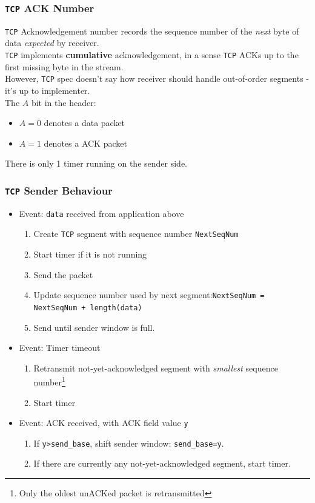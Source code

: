 \documentclass[12pt]{article}
\newcommand\TCP{\texttt{TCP} }
\theoremstyle{definition}
\begin{document}
\subsubsection{\TCP ACK Number}
\TCP Acknowledgement number records the sequence number of the \textit{next} byte of data \textit{expected} by receiver.\\

\TCP implements \textbf{cumulative} acknowledgement, in a sense \TCP ACKs up to the first missing byte in the stream.\\

However, \TCP spec doesn't say how receiver should handle out-of-order segments - it's up to implementer.\\

The $A$ bit in the header:
\begin{itemize}
  \item $A=0$ denotes a data packet
  \item $A=1$ denotes a ACK packet
\end{itemize}
There is only 1 timer running on the sender side.
\subsubsection{\TCP Sender Behaviour}
\begin{itemize}
  \item Event: \texttt{data} received from application above
  \begin{enumerate}
    \item Create \TCP segment with sequence number \texttt{NextSeqNum}
    \item Start timer if it is not running
    \item Send the packet
    \item Update sequence number used by next segment:\texttt{NextSeqNum = NextSeqNum + length(data)}
    \item Send until sender window is full.
  \end{enumerate}
  \item Event: Timer timeout
  \begin{enumerate}
    \item Retransmit not-yet-acknowledged segment with \textit{smallest} sequence number\footnote{Only the oldest unACKed packet is retransmitted}
    \item Start timer
  \end{enumerate}
  \item Event: ACK received, with ACK field value \texttt{y}
  \begin{enumerate}
    \item If \texttt{y>send\_base}, shift sender window: \texttt{send\_base=y}.
    \item If there are currently any not-yet-acknowledged segment, start timer.
  \end{enumerate}
\end{itemize}
\end{document}
